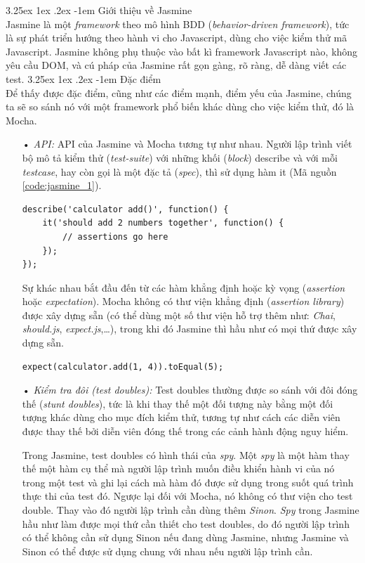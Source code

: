 \documentclass[12pt,a4paper,twoside]{article}
\makeatletter
\newcommand{\myparagraph}[1]{\paragraph{#1}\mbox{}\\} %
\renewcommand\paragraph{\@startsection{paragraph}{5}{\z@}%
  {3.25ex \@plus1ex \@minus.2ex}%
  {-1em}%
  {\normalfont\normalsize\bfseries}}
\makeatother
\begin{document}
\myparagraph{Giới thiệu về Jasmine}
Jasmine là một \textit{framework} theo mô hình BDD (\textit{behavior-driven framework}), tức là sự phát triển hướng theo hành vi cho Javascript, dùng cho việc kiểm thử mã Javascript. Jasmine không phụ thuộc vào bất kì framework Javascript nào, không yêu cầu DOM, và cú pháp của Jasmine rất gọn gàng, rõ ràng, dễ dàng viết các test.
\myparagraph{Đặc điểm}
Để thấy được đặc điểm, cũng như các điểm mạnh, điểm yếu của Jasmine, chúng ta sẽ so sánh\cite{mocha_vs_jasmine} nó với một framework phổ biến khác dùng cho việc kiểm thử, đó là Mocha.
\begin{itemize}
\item[•] \emph{API:} 
API của Jasmine và Mocha tương tự như nhau. Người lập trình viết bộ mô tả kiểm thử (\textit{test-suite}) với những khối (\textit{block}) \textsf{describe} và với mỗi \textit{testcase}, hay còn gọi là một đặc tả (\textit{spec}), thì sử dụng hàm \textsf{it} (Mã nguồn \ref{code:jasmine_1}).

\begin{lstlisting}[caption=Cấu trúc của một test-suite trong Jasmine,label={code:jasmine_1}]
describe('calculator add()', function() {
	it('should add 2 numbers together', function() {
		// assertions go here
	});
});
\end{lstlisting}

Sự khác nhau bắt đầu đến từ các hàm khẳng định hoặc kỳ vọng (\textit{assertion} hoặc \textit{expectation}). Mocha không có thư viện khẳng định (\textit{assertion library}) được xây dựng sẵn (có thể dùng một số thư viện hỗ trợ thêm như: \textit{Chai}, \textit{should.js}, \textit{expect.js},…), trong khi đó Jasmine thì hầu như có mọi thứ được xây dựng sẵn.

\begin{lstlisting}[caption=Ví dụ sử dụng \textsf{expect} trong Jasmine,label={code:jasmine_2}]
expect(calculator.add(1, 4)).toEqual(5);
\end{lstlisting}

\item[•] \emph{Kiểm tra đôi (test doubles):}
Test doubles thường được so sánh với đôi đóng thế (\textit{stunt doubles}), tức là khi thay thế một đối tượng này bằng một đối tượng khác dùng cho mục đích kiểm thử, tương tự như cách các diễn viên được thay thế bởi diễn viên đóng thế trong các cảnh hành động nguy hiểm.

Trong Jasmine, test doubles có hình thái của \textit{spy}. Một \textit{spy} là một hàm thay thế một hàm cụ thể mà người lập trình muốn điều khiển hành vi của nó trong một test và ghi lại cách mà hàm đó được sử dụng trong suốt quá trình thực thi của test đó.
Ngược lại đối với Mocha, nó không có thư viện cho test double. Thay vào đó người lập trình cần dùng thêm \textit{Sinon}. \textit{Spy} trong Jasmine hầu như làm được mọi thứ cần thiết cho test doubles, do đó người lập trình có thể không cần sử dụng Sinon nếu đang dùng Jasmine, nhưng Jasmine và Sinon có thể được sử dụng chung với nhau nếu người lập trình cần.


\end{itemize}
\end{document}
